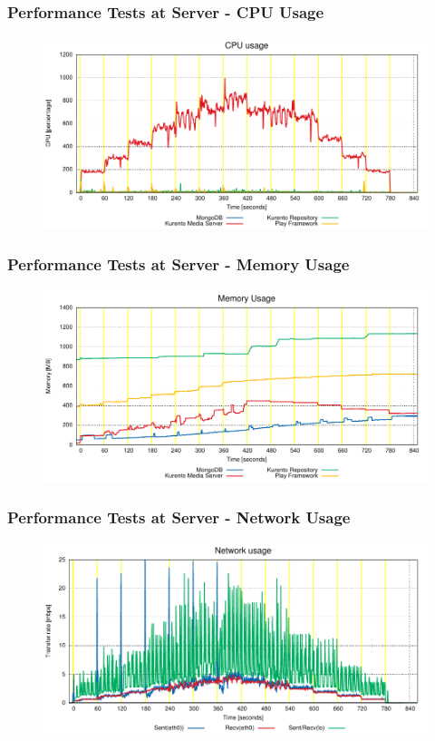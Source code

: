 \documentclass[compress]{beamer}
\begin{document}
	\begin{frame}[c]
		\frametitle{Performance Tests at Server - CPU Usage}
		\begin{figure}[H]
			\includegraphics[width=\textwidth]{figures/cpu.pdf}
		\end{figure}
	\end{frame}
	\begin{frame}[c]
		\frametitle{Performance Tests at Server - Memory Usage}
		\begin{figure}[H]
			\includegraphics[width=\textwidth]{figures/ram.pdf}
		\end{figure}
	\end{frame}
	\begin{frame}[c]
		\frametitle{Performance Tests at Server - Network Usage}
		\begin{figure}[H]
			\includegraphics[width=\textwidth]{figures/net.pdf}
		\end{figure}
	\end{frame}
\end{document}
